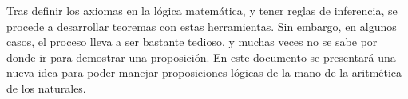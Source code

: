 
Tras definir los axiomas en la lógica matemática, y tener reglas de inferencia, se procede a desarrollar teoremas con estas herramientas. Sin embargo, en algunos casos, el proceso lleva a ser bastante tedioso, y muchas veces no se sabe por donde ir para demostrar una proposición. En este documento se presentará una nueva idea para poder manejar proposiciones lógicas de la mano de la aritmética de los naturales.


